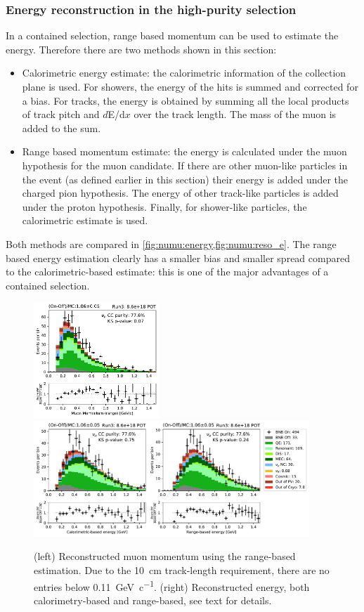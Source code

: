 \subsubsection{Energy reconstruction in the high-purity selection} 
In a contained selection, range based momentum can be used to estimate the energy. Therefore there are two methods shown in this section:
\begin{itemize}
    \item Calorimetric energy estimate: the calorimetric information of the collection plane is used. For showers, the energy of the hits is summed and corrected for a bias. For tracks, the energy is obtained by summing all  the local products of track pitch and $d$E/d$x$ over the track length. The mass of the muon is added to the sum. 
    \item Range based momentum estimate: the energy is calculated under the muon hypothesis for the muon candidate. If there are other muon-like particles in the event (as defined earlier in this section) their energy is added under the charged pion hypothesis. The energy of other track-like particles is added under the proton hypothesis. Finally, for shower-like particles, the calorimetric estimate is used.
\end{itemize}
Both methods are compared in \cref{fig:numu:energy,fig:numu:reso_e}. The range based energy estimation clearly has a smaller bias and smaller spread compared to the calorimetric-based estimate: this is one of the major advantages of a contained selection.

\begin{figure}[H]
    \centering
    \includegraphics[height=4.35cm]{NuMuCCsel/Images/run3/numu_rangemom_run3} \hspace{2mm}
    \includegraphics[height=4.35cm]{NuMuCCsel/Images/run3/numu_caloe_rangevscalo_run3.pdf}
    \caption{(left) Reconstructed muon momentum using the range-based estimation. Due to the \SI{10}{\cm} track-length requirement, there are no entries below \SI{0.11}{\GeV \per c}. (right) Reconstructed energy, both calorimetry-based and range-based, see text for details.}
    \label{fig:numu:energy}
\end{figure}

